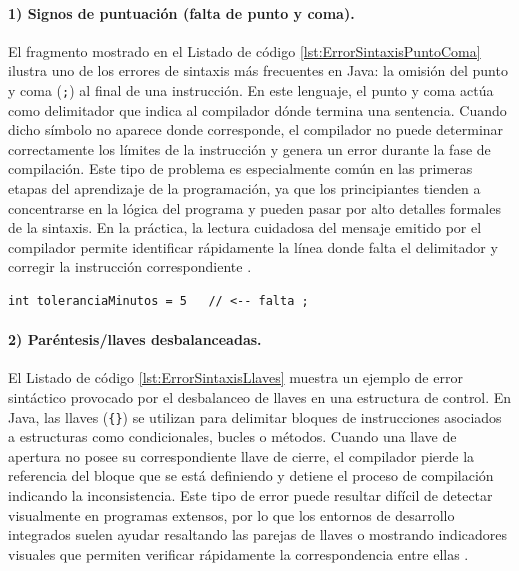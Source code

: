 \documentclass[12pt,twoside]{book}
\begin{document}
						\paragraph{1) Signos de puntuación (falta de punto y coma).} El fragmento mostrado en el Listado de código \ref{lst:ErrorSintaxisPuntoComa} ilustra uno de los errores de sintaxis más frecuentes en Java: la omisión del punto y coma (\texttt{;}) al final de una instrucción. En este lenguaje, el punto y coma actúa como delimitador que indica al compilador dónde termina una sentencia. Cuando dicho símbolo no aparece donde corresponde, el compilador no puede determinar correctamente los límites de la instrucción y genera un error durante la fase de compilación. Este tipo de problema es especialmente común en las primeras etapas del aprendizaje de la programación, ya que los principiantes tienden a concentrarse en la lógica del programa y pueden pasar por alto detalles formales de la sintaxis. En la práctica, la lectura cuidadosa del mensaje emitido por el compilador permite identificar rápidamente la línea donde falta el delimitador y corregir la instrucción correspondiente \cite{Deitel2025Java,Gaddis2022Starting}.
						
						\begin{lstlisting}[style=Java,caption={Error de sintaxis: falta de punto y coma.},label={lst:ErrorSintaxisPuntoComa}]
	int toleranciaMinutos = 5   // <-- falta ; \end{lstlisting}
						
						\paragraph{2) Paréntesis/llaves desbalanceadas.} El Listado de código \ref{lst:ErrorSintaxisLlaves} muestra un ejemplo de error sintáctico provocado por el desbalanceo de llaves en una estructura de control. En Java, las llaves (\texttt{\{\}}) se utilizan para delimitar bloques de instrucciones asociados a estructuras como condicionales, bucles o métodos. Cuando una llave de apertura no posee su correspondiente llave de cierre, el compilador pierde la referencia del bloque que se está definiendo y detiene el proceso de compilación indicando la inconsistencia. Este tipo de error puede resultar difícil de detectar visualmente en programas extensos, por lo que los entornos de desarrollo integrados suelen ayudar resaltando las parejas de llaves o mostrando indicadores visuales que permiten verificar rápidamente la correspondencia entre ellas \cite{Sebesta2018Concepts,Pressman2019Software}.
						
\end{document}
